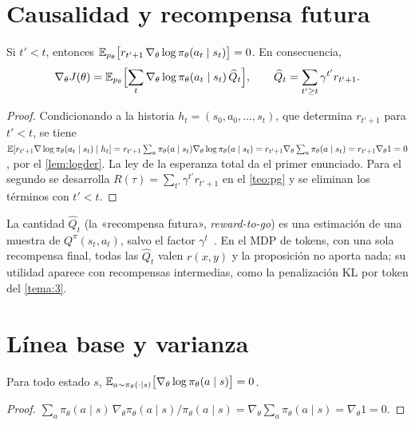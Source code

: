 \section{Causalidad y recompensa futura}

\begin{proposicion}\label{prop:causalidad}
Si $t'<t$, entonces $\mathbb{E}_{p_\theta}\bigl[r_{t'+1}\,\nabla_\theta\log\pi_\theta(a_t\mid s_t)\bigr]=0$. En consecuencia,
\[
\nabla_\theta J(\theta)=\mathbb{E}_{p_\theta}\Bigl[\sum_{t}\nabla_\theta\log\pi_\theta(a_t\mid s_t)\,\widehat{Q}_t\Bigr],\qquad \widehat Q_t=\sum_{t'\ge t}\gamma^{t'}r_{t'+1}.
\]
\end{proposicion}

\begin{proof}
Condicionando a la historia $h_t=(s_0,a_0,\dots,s_t)$, que determina $r_{t'+1}$ para $t'<t$, se tiene
$\mathbb{E}[r_{t'+1}\nabla\log\pi_\theta(a_t\mid s_t)\mid h_t]=r_{t'+1}\sum_{a}\pi_\theta(a\mid s_t)\nabla_\theta\log\pi_\theta(a\mid s_t)=r_{t'+1}\nabla_\theta\sum_a\pi_\theta(a\mid s_t)=r_{t'+1}\nabla_\theta 1=0$, por el \cref{lem:logder}. La ley de la esperanza total da el primer enunciado. Para el segundo se desarrolla $R(\tau)=\sum_{t'}\gamma^{t'}r_{t'+1}$ en el \cref{teo:pg} y se eliminan los términos con $t'<t$.
\end{proof}

La cantidad $\widehat Q_t$ (la «recompensa futura», \emph{reward-to-go}) es una estimación de una muestra de $Q^{\pi}(s_t,a_t)$, salvo el factor $\gamma^{t}$~\cite{cs285hw2}. En el MDP de tokens, con una sola recompensa final, todas las $\widehat Q_t$ valen $r(x,y)$ y la proposición no aporta nada; su utilidad aparece con recompensas intermedias, como la penalización KL por token del \cref{tema:3}.

\section{Línea base y varianza}

\begin{lema}\label{lem:score-media}
Para todo estado $s$, $\mathbb{E}_{a\sim\pi_\theta(\cdot\mid s)}\bigl[\nabla_\theta\log\pi_\theta(a\mid s)\bigr]=0$.
\end{lema}

\begin{proof}
$\sum_a\pi_\theta(a\mid s)\,\nabla_\theta\pi_\theta(a\mid s)/\pi_\theta(a\mid s)=\nabla_\theta\sum_a\pi_\theta(a\mid s)=\nabla_\theta 1=0$.
\end{proof}

